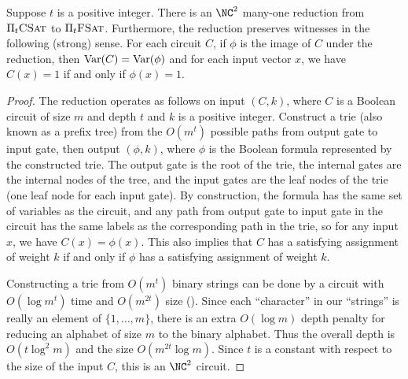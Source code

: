 \begin{lemma}\label{lem:circuittoformula}
  Suppose $t$ is a positive integer.
  There is an $\NC^2$ many-one reduction from $\Pi_t \textsc{CSat}$ to $\Pi_t \textsc{FSat}$.
  Furthermore, the reduction preserves witnesses in the following (strong) sense.
  For each circuit $C$, if $\phi$ is the image of $C$ under the reduction, then $\operatorname{Var}(C) = \operatorname{Var}(\phi)$ and for each input vector $x$, we have $C(x) = 1$ if and only if $\phi(x) = 1$.
\end{lemma}
\begin{proof}
  The reduction operates as follows on input $(C, k)$, where $C$ is a Boolean circuit of size $m$ and depth $t$ and $k$ is a positive integer.
  Construct a trie (also known as a prefix tree) from the $O(m^t)$ possible paths from output gate to input gate, then output $(\phi, k)$, where $\phi$ is the Boolean formula represented by the constructed trie.
  The output gate is the root of the trie, the internal gates are the internal nodes of the tree, and the input gates are the leaf nodes of the trie (one leaf node for each input gate).
  By construction, the formula has the same set of variables as the circuit, and any path from output gate to input gate in the circuit has the same labels as the corresponding path in the trie, so for any input $x$, we have $C(x) = \phi(x)$.
  This also implies that $C$ has a satisfying assignment of weight $k$ if and only if $\phi$ has a satisfying assignment of weight $k$.

  Constructing a trie from $O(m^t)$ binary strings can be done by a circuit with $O(\log m^t)$ time and $O(m^{2t})$ size \autocite{lv86} ().
  Since each ``character'' in our ``strings'' is really an element of $\{1, \dotsc, m\}$, there is an extra $O(\log m)$ depth penalty for reducing an alphabet of size $m$ to the binary alphabet.
  Thus the overall depth is $O(t \log^2 m)$ and the size $O(m^{2t} \log m)$.
  Since $t$ is a constant with respect to the size of the input $C$, this is an $\NC^2$ circuit.
\end{proof}


